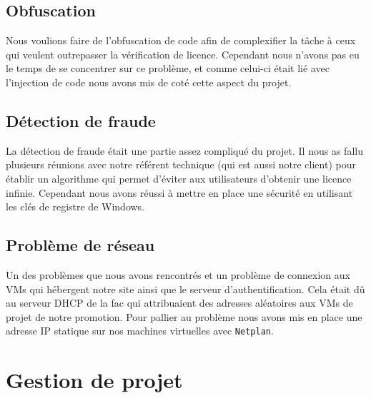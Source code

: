 \subsection{Obfuscation}

Nous voulions faire de l'obfuscation de code afin de complexifier la tâche à ceux qui veulent outrepasser la vérification de licence. Cependant nous n'avons pas eu le temps
de se concentrer sur ce problème, et comme celui-ci était lié avec l'injection de code nous avons mis de coté cette aspect du projet.

\subsection{Détection de fraude}

La détection de fraude était une partie assez compliqué du projet. Il nous as fallu plusieurs réunions avec notre référent technique (qui est aussi notre client) pour établir
un algorithme qui permet d'éviter aux utilisateurs d'obtenir une licence infinie. Cependant nous avons réussi à mettre en place une sécurité en utilisant les clés de registre
de Windows.

\subsection{Problème de réseau}

Un des problèmes que nous avons rencontrés et un problème de connexion aux VMs qui hébergent notre site ainsi que le serveur d'authentification. Cela était dû au serveur DHCP
de la fac qui attribuaient des adresses aléatoires aux VMs de projet de notre promotion. Pour pallier au problème nous avons mis en place une adresse IP statique sur nos
machines virtuelles avec \verb:Netplan:.


\section{Gestion de projet}

